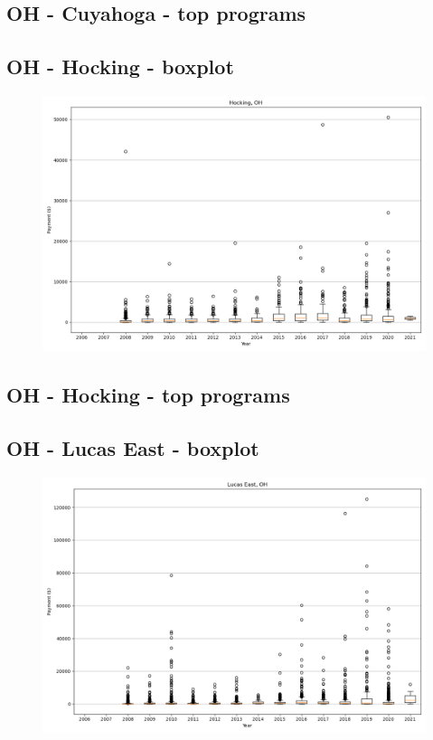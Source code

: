 \subsection*{OH - Cuyahoga - top programs}

\newpage
\subsection*{OH - Hocking - boxplot}
\begin{figure}[h]
\centering
\includegraphics[width=7in]{../output/boxplots/counties/Hocking-OH_boxplot.png}
\end{figure}


\subsection*{OH - Hocking - top programs}

\newpage
\subsection*{OH - Lucas East - boxplot}
\begin{figure}[h]
\centering
\includegraphics[width=7in]{../output/boxplots/counties/Lucas East-OH_boxplot.png}
\end{figure}


